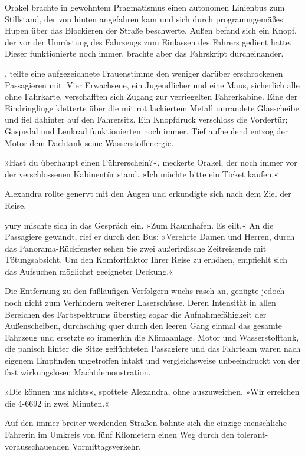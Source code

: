 Orakel brachte in gewohntem Pragmatismus einen autonomen Linienbus zum Stillstand, der von hinten angefahren kam und sich durch programmgemäßes Hupen über das Blockieren der Straße beschwerte. Außen befand sich ein Knopf, der vor der Umrüstung des Fahrzeugs zum Einlassen des Fahrers gedient hatte. Dieser funktionierte noch immer, brachte aber das Fahrskript durcheinander.

, teilte eine aufgezeichnete Frauenstimme den weniger darüber erschrockenen Passagieren mit. Vier Erwachsene, ein Jugendlicher und eine Maus, sicherlich alle ohne Fahrkarte, verschafften sich Zugang zur verriegelten Fahrerkabine. Eine der Eindringlinge kletterte über die mit rot lackiertem Metall umrandete Glasscheibe und fiel dahinter auf den Fahrersitz. Ein Knopfdruck verschloss die Vordertür; Gaspedal und Lenkrad funktionierten noch immer. Tief aufheulend entzog der Motor dem Dachtank seine Wasserstoffenergie.

»Hast du überhaupt einen Führerschein?«, meckerte Orakel, der noch immer vor der verschlossenen Kabinentür stand. »Ich möchte bitte ein Ticket kaufen.«

Alexandra rollte genervt mit den Augen und erkundigte sich nach dem Ziel der Reise.

yury mischte sich in das Gespräch ein. »Zum Raumhafen. Es eilt.« An die Passagiere gewandt, rief er durch den Bus: »Verehrte Damen und Herren, durch das Panorama-Rückfenster sehen Sie zwei außerirdische Zeitreisende mit Tötungsabsicht. Um den Komfortfaktor Ihrer Reise zu erhöhen, empfiehlt sich das Aufsuchen möglichst geeigneter Deckung.«

Die Entfernung zu den fußläufigen Verfolgern wuchs rasch an, genügte jedoch noch nicht zum Verhindern weiterer Laserschüsse. Deren Intensität in allen Bereichen des Farbspektrums überstieg sogar die Aufnahmefähigkeit der Außenscheiben, durchschlug quer durch den leeren Gang einmal das gesamte Fahrzeug und ersetzte so immerhin die Klimaanlage. Motor und Wasserstofftank, die panisch hinter die Sitze geflüchteten Passagiere und das Fahrteam waren nach eigenem Empfinden ungetroffen intakt und vergleichsweise unbeeindruckt von der fast wirkungslosen Machtdemonstration.

»Die können uns nichts«, spottete Alexandra, ohne auszuweichen. »Wir erreichen die 4-6692 in zwei Minuten.«

Auf den immer breiter werdenden Straßen bahnte sich die einzige menschliche Fahrerin im Umkreis von fünf Kilometern einen Weg durch den tolerant-vorausschauenden Vormittagsverkehr.

